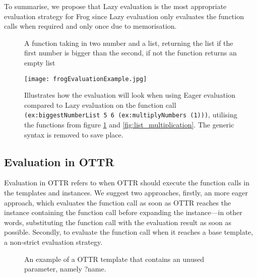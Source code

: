 \para
To summarise, we propose that Lazy evaluation is the most appropriate evaluation strategy for Frog since Lazy evaluation only evaluates the function calls when required and only once due to memorisation.

\begin{figure}
    
    \caption{A function taking in two number and a list, returning the list if the first number is bigger than the second, if not the function returns an empty list}
    \label{fig:biggestNumberList}
\end{figure}

\begin{figure}
    \centering
    \texttt{[image: frogEvaluationExample.jpg]}
    \caption{Illustrates how the evaluation will look when using Eager evaluation compared to Lazy evaluation on the function call \lstinline{(ex:biggestNumberList 5 6 (ex:multiplyNumbers (1)))}, utilising the functions from figure \ref{fig:biggestNumberList} and \ref{fig:list_multiplication}.  The generic syntax is removed to save place. }
    \label{fig:leVSEe_example_frog}
\end{figure}

\subsection{Evaluation in OTTR}
Evaluation in OTTR refers to when OTTR should execute the function calls in the templates and instances. We suggest two approaches, firstly, an more eager approach, which evaluates the function call as soon as OTTR reaches the instance containing the function call before expanding the instance—in other words, substituting the function call with the evaluation result as soon as possible. Secondly, to evaluate the function call when it reaches a base template, a non-strict evaluation strategy.

\begin{figure}
    
    \caption{An example of a OTTR template that contains an unused parameter, namely ?name. }
    \label{fig:ottr_evaluation_example}
\end{figure}


